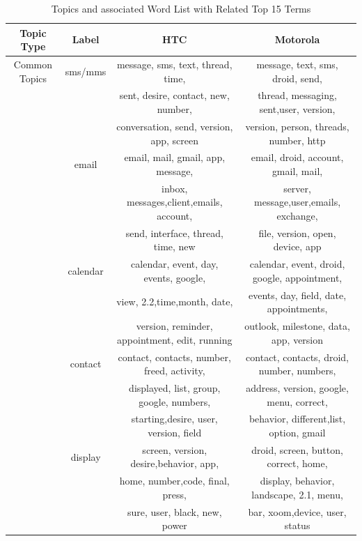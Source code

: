 \documentclass[10pt, conference, compsocconf]{IEEEtran}
\begin{document}
\begin{table}[!htb]
\renewcommand{\arraystretch}{1.3}
\caption{Topics and associated Word List with Related Top 15 Terms}
\label{topicslist}
\centering
\begin{tabular}{|c||c||c||c|}
\hline
Topic Type & Label & HTC & Motorola\\ 
\hline
Common Topics & sms\//mms &message,	sms,	text, thread, time,  & message, text, sms, droid, send,	\\
&& sent, desire, contact, new, number, &	thread, messaging, sent,user, version,\\ 
&&conversation, send, version, app, screen &version, person, threads, number, http\\ \cline{2-4}

  & email & email, mail, gmail, app, message,   &email, droid, account,	gmail, mail, \\
&&inbox, messages,client,emails, account,  &server, message,user,emails, exchange, \\ 
&&send, interface, thread, time, new & file, version, open, device, app\\ \cline{2-4}
            
& calendar&calendar, event, day, events, google,  &calendar,	event, droid, google, appointment, \\
&&view, 2.2,time,month, date, &events, day, field, date, appointments, \\ 
&&version, reminder, appointment,  edit, running &outlook, milestone, data, app, version\\ \cline{2-4}
            
& contact & contact, contacts, number, freed, activity,  &contact, contacts, droid, number, numbers, \\
&&displayed, list, group, google, numbers,   &address, version, google, menu, correct, \\
&&starting,desire, user, version, field & behavior, different,list, option, gmail\\ \cline{2-4}
            
  & display&screen, version, desire,behavior, app, &droid, screen, button, correct, home, \\
&& home, number,code, final, press,  &display, behavior,  landscape, 2.1,  menu, \\
&&sure, user, black, new, power  &bar, xoom,device, user, status\\ \cline{2-4}
   

\end{tabular}
\end{table}
\end{document}
